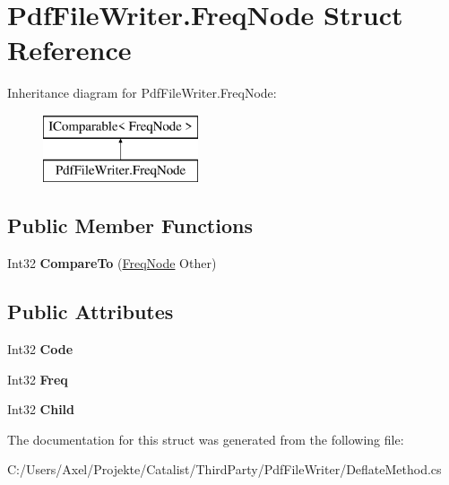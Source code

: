 \hypertarget{struct_pdf_file_writer_1_1_freq_node}{}\section{Pdf\+File\+Writer.\+Freq\+Node Struct Reference}
\label{struct_pdf_file_writer_1_1_freq_node}
Inheritance diagram for Pdf\+File\+Writer.\+Freq\+Node\+:\begin{figure}[H]
\begin{center}
\leavevmode
\includegraphics[height=2.000000cm]{struct_pdf_file_writer_1_1_freq_node}
\end{center}
\end{figure}
\subsection*{Public Member Functions}
\begin{DoxyCompactItemize}
\item 
Int32 {\bfseries Compare\+To} (\hyperlink{struct_pdf_file_writer_1_1_freq_node}{Freq\+Node} Other)\hypertarget{struct_pdf_file_writer_1_1_freq_node_a1549dd67a0409f6e5c0f1062ebf3a745}{}\label{struct_pdf_file_writer_1_1_freq_node_a1549dd67a0409f6e5c0f1062ebf3a745}

\end{DoxyCompactItemize}
\subsection*{Public Attributes}
\begin{DoxyCompactItemize}
\item 
Int32 {\bfseries Code}\hypertarget{struct_pdf_file_writer_1_1_freq_node_ad61922554975d34a36d5bdb939906806}{}\label{struct_pdf_file_writer_1_1_freq_node_ad61922554975d34a36d5bdb939906806}

\item 
Int32 {\bfseries Freq}\hypertarget{struct_pdf_file_writer_1_1_freq_node_a3952691d1ed1b10d3733afb500029273}{}\label{struct_pdf_file_writer_1_1_freq_node_a3952691d1ed1b10d3733afb500029273}

\item 
Int32 {\bfseries Child}\hypertarget{struct_pdf_file_writer_1_1_freq_node_aa661ce6a41a9c014788070d46e70dd16}{}\label{struct_pdf_file_writer_1_1_freq_node_aa661ce6a41a9c014788070d46e70dd16}

\end{DoxyCompactItemize}


The documentation for this struct was generated from the following file\+:\begin{DoxyCompactItemize}
\item 
C\+:/\+Users/\+Axel/\+Projekte/\+Catalist/\+Third\+Party/\+Pdf\+File\+Writer/Deflate\+Method.\+cs\end{DoxyCompactItemize}

